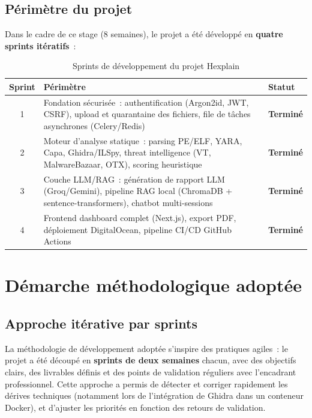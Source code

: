 \subsection{Périmètre du projet}

Dans le cadre de ce stage (8 semaines), le projet a été développé en \textbf{quatre sprints itératifs}~:

\begin{table}[H]
  \centering
  \caption{Sprints de développement du projet Hexplain}
  \label{tab:sprints}
  \begin{tabularx}{\textwidth}{c X l}
    \toprule
    \textbf{Sprint} & \textbf{Périmètre} & \textbf{Statut} \\
    \midrule
    1 & Fondation sécurisée~: authentification (Argon2id, JWT, CSRF), upload et quarantaine des fichiers, file de tâches asynchrones (Celery/Redis) & \textcolor{successgreen}{\textbf{Terminé}} \\
    \midrule
    2 & Moteur d'analyse statique~: parsing PE/ELF, YARA, Capa, Ghidra/ILSpy, threat intelligence (VT, MalwareBazaar, OTX), scoring heuristique & \textcolor{successgreen}{\textbf{Terminé}} \\
    \midrule
    3 & Couche LLM/RAG~: génération de rapport LLM (Groq/Gemini), pipeline RAG local (ChromaDB + sentence-transformers), chatbot multi-sessions & \textcolor{successgreen}{\textbf{Terminé}} \\
    \midrule
    4 & Frontend dashboard complet (Next.js), export PDF, déploiement DigitalOcean, pipeline CI/CD GitHub Actions & \textcolor{successgreen}{\textbf{Terminé}} \\
    \bottomrule
  \end{tabularx}
\end{table}

\section{Démarche méthodologique adoptée}

\subsection{Approche itérative par sprints}

La méthodologie de développement adoptée s'inspire des pratiques agiles~: le projet a été découpé en \textbf{sprints de deux semaines} chacun, avec des objectifs clairs, des livrables définis et des points de validation réguliers avec l'encadrant professionnel. Cette approche a permis de détecter et corriger rapidement les dérives techniques (notamment lors de l'intégration de Ghidra dans un conteneur Docker), et d'ajuster les priorités en fonction des retours de validation.

